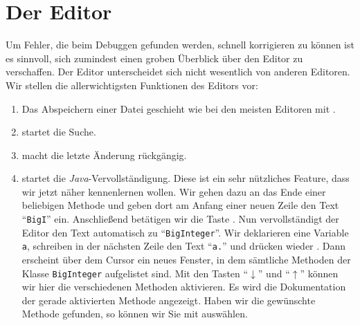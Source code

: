 \documentclass{article}
\begin{document}
\section{Der Editor}
Um Fehler, die beim Debuggen gefunden werden, schnell korrigieren zu k\"onnen ist es
sinnvoll, sich zumindest einen groben Überblick \"uber den Editor zu verschaffen.
 Der Editor unterscheidet sich nicht wesentlich von anderen Editoren.
Wir stellen die allerwichtigsten Funktionen des Editors vor:
\begin{enumerate}
\item Das Abspeichern einer Datei geschieht wie bei den meisten Editoren mit .
\item {} startet die Suche.
\item {} macht die letzte Änderung r\"uckg\"angig.
\item {} startet die \textsl{Java}-Vervollst\"andigung.
      Diese ist ein sehr n\"utzliches Feature, dass wir jetzt n\"aher kennenlernen wollen.
      Wir gehen dazu an das Ende einer beliebigen Methode  und geben dort am Anfang einer
      neuen Zeile den Text ``\texttt{BigI}'' ein. Anschlie{\ss}end bet\"atigen wir
      die Taste .  Nun vervollst\"andigt der Editor 
      den Text automatisch zu ``\texttt{BigInteger}''.  Wir deklarieren eine Variable
      \texttt{a}, schreiben in der  n\"achsten Zeile den Text ``\texttt{a.}'' und dr\"ucken
      wieder . Dann erscheint \"uber dem Cursor ein neues
      Fenster, in dem s\"amtliche Methoden der Klasse \texttt{BigInteger} aufgelistet sind.
      Mit den Tasten ``$\downarrow$'' und ``$\uparrow$'' k\"onnen wir hier die verschiedenen Methoden
      aktivieren.  Es wird die Dokumentation der gerade aktivierten Methode angezeigt.  Haben wir
      die gew\"unschte Methode gefunden, so k\"onnen wir Sie mit 
      ausw\"ahlen.


\end{enumerate}
\end{document}
